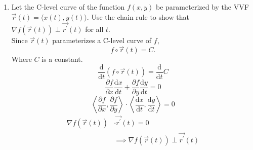 \begin{enumerate}
	\item Let the C-level curve of the function $f(x,y)$ be parameterized by the VVF $\vec{r}(t) = \langle x(t), y(t) \rangle$. Use the chain rule to show that $\nabla f(\vec{r}(t))\perp\vec{r^\prime}(t)$ for all $t$.\\
	Since $\vec{r}(t)$ parameterizes a C-level curve of $f$,
	\begin{equation*}
		f\circ\vec{r}(t) = C.
	\end{equation*}
	Where $C$ is a constant.
	\begin{equation*}
		\frac{\mathrm{d}}{\mathrm{d}t}(f\circ\vec{r}(t)) = \frac{\mathrm{d}}{\mathrm{d}t}C
	\end{equation*}
	\begin{equation*}
		\frac{\partial f}{\partial x}\frac{\mathrm{d}x}{\mathrm{d}t} + \frac{\partial f}{\partial y}\frac{\mathrm{d}y}{\mathrm{d}t} = 0
	\end{equation*}
	\begin{equation*}
		\left<\frac{\partial f}{\partial x}, \frac{\partial f}{\partial y}\right> \cdot \left<\frac{\mathrm{d}x}{\mathrm{d}t}, \frac{\mathrm{d}y}{\mathrm{d}t}\right> = 0
	\end{equation*}
	\begin{align*}
		\nabla f(\vec{r}(t)) &\cdot \vec{r^\prime}(t) = 0 \\
		&\implies \nabla f(\vec{r}(t))\perp\vec{r^\prime}(t)
	\end{align*}
\end{enumerate}